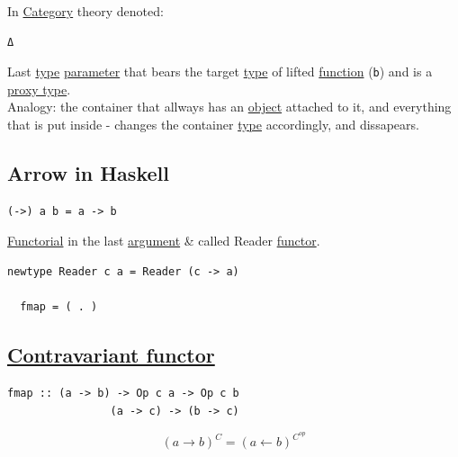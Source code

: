 \documentclass[11pt]{article}
\begin{document}
In \hyperref[org0450535]{Category} theory denoted:\\
\begin{verbatim}
Δ
\end{verbatim}

Last \hyperref[orgc4aea2f]{type} \hyperref[org0e7674e]{parameter} that bears the target \hyperref[orgc4aea2f]{type} of lifted \hyperref[orge15bc14]{function} (\texttt{b}) and is a \hyperref[orgd50d098]{proxy type}.\\

Analogy: the container that allways has an \hyperref[org4be0e9d]{object} attached to it, and everything that is put inside - changes the container \hyperref[orgc4aea2f]{type} accordingly, and dissapears.\\

\subsection{\label{org5c832b5}Arrow in Haskell}
\label{sec:orgd48c608}

\begin{verbatim}
(->) a b = a -> b
\end{verbatim}
\hyperref[org443767a]{Functorial} in the last \hyperref[orga6b7e97]{argument} \& called Reader \hyperref[orgf2f6841]{functor}.\\

\begin{verbatim}
newtype Reader c a = Reader (c -> a)

  fmap = ( . )
\end{verbatim}

\subsection{\hyperref[orge5e36a5]{Contravariant functor}}
\label{sec:org20efa0c}

\begin{verbatim}
fmap :: (a -> b) -> Op c a -> Op c b
                (a -> c) -> (b -> c)
\end{verbatim}


$$ (a \to b)^{C} = (a \leftarrow b)^{C^{op}} $$\\
\end{document}
